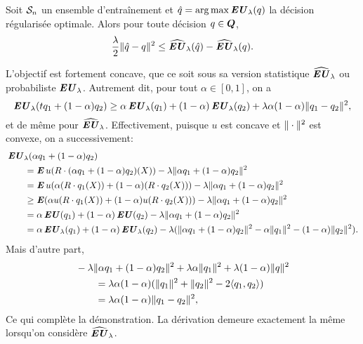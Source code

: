 \begin{lemme}
  \label{lem:conv}
  Soit $\S_n$ un ensemble d'entraînement et $\qh = \argmax\EU_\lambda(q)$ la décision
  régularisée optimale. Alors pour toute décision $q \in \Q$,
  \begin{equation}
    \frac{\lambda}{2}\|\qh - q\|^2 \leq \hEU_\lambda(\qh) - \hEU_\lambda(q).
  \end{equation}
\end{lemme}



\begin{lemme}
  L'objectif est fortement concave, que ce soit sous sa version statistique $\hEU_\lambda$ ou
  probabiliste $\EU_\lambda$. Autrement dit, pour tout $\alpha \in [0,1]$, on a
  \begin{equation}
    \EU_\lambda(tq_1 + (1-\alpha )q_2) \geq \alpha \EU_\lambda(q_1) + (1-\alpha)\EU_\lambda(q_2) + \lambda \alpha(1-\alpha)\nq{q_1-q_2}^2,
  \end{equation}
  et de même pour $\hEU_\lambda$. Effectivement, puisque $u$ est concave et $\nq{\cdot}^2$ est
  convexe, on a successivement:
  \begin{align}
    & \EU_\lambda(\alpha q_1 + (1-\alpha )q_2)\\
    &\qquad= \E u(R\cdot (\alpha q_1+(1-\alpha )q_2)(X)) - \lambda\nq{\alpha q_1 + (1-\alpha)q_2}^2\\
    &\qquad= \E u(\alpha (R\cdot q_1(X)) + (1-\alpha )(R\cdot q_2(X)))- \lambda\nq{\alpha q_1 + (1-\alpha)q_2}^2\\
    &\qquad\geq \E(\alpha  u(R\cdot q_1(X)) + (1-\alpha )u(R\cdot q_2(X))) - \lambda\nq{\alpha q_1 + (1-\alpha)q_2}^2\\
    &\qquad= \alpha\EU(q_1) + (1-\alpha)\EU(q_2) - \lambda\nq{\alpha q_1 + (1-\alpha)q_2}^2\\
    &\qquad= \alpha\EU_\lambda(q_1) + (1-\alpha)\EU_\lambda(q_2) - \lambda(\nq{\alpha q_1+(1-\alpha)q_2}^2 - \alpha\nq{q_1}^2 -
      (1-\alpha)\nq{q_2}^2).
  \end{align}
  Mais d'autre part,
  \begin{align}
    &-\lambda\nq{\alpha q_1 + (1-\alpha)q_2}^2 + \lambda\alpha\nq{q_1}^2+\lambda(1-\alpha)\nq{q}^2\\
    &\qquad = \lambda\alpha(1-\alpha)(\nq{q_1}^2 + \nq{q_2}^2 - 2\langle q_1,q_2\rangle)\\
    &\qquad = \lambda\alpha(1-\alpha)\nq{q_1-q_2}^2,
  \end{align}
  Ce qui complète la démonstration. La dérivation demeure exactement la même lorsqu'on
  considère $\hEU_\lambda$.
\end{lemme}

